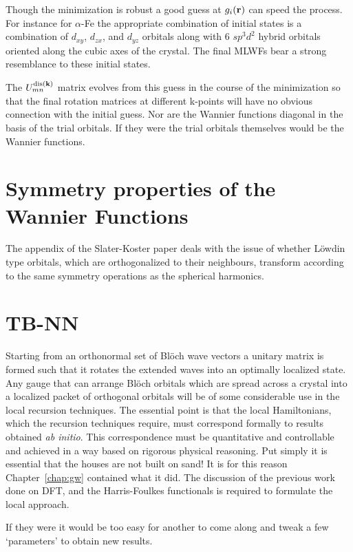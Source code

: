 Though the minimization is robust a good guess at $g_{i}({\bf r})$ can speed the process.
For instance for $\alpha$-Fe the appropriate combination of initial states is a combination of 
$d_{xy}$, $d_{zx}$, and $d_{yz}$ orbitals along with 6 $sp^{3}d^{2}$ hybrid orbitals oriented along the 
cubic axes of the crystal. The final MLWFs bear a strong resemblance to these initial states.

The $U^{{\rm dis}({\bf k})}_{mn}$ matrix evolves from this guess in the course of the 
minimization so that the final rotation matrices at different k-points will have no 
obvious connection with the initial guess. Nor are the Wannier functions diagonal in the basis 
of the trial orbitals. If they were the trial orbitals themselves would be the Wannier functions. 

\section{Symmetry properties of the Wannier Functions}
The appendix of the Slater-Koster paper deals with the issue of whether L\"owdin type
orbitals, which are orthogonalized to their neighbours, transform according to the same
symmetry operations as the spherical harmonics.

\section{TB-NN}
Starting from an orthonormal set
of Bl\"och wave vectors a unitary matrix is formed such that it rotates the
extended waves into an optimally localized state.
Any gauge that can arrange Bl\"och orbitals which are spread 
across a crystal into a localized
packet of orthogonal orbitals will be of some considerable use in the local recursion techniques.
The essential point is that the local Hamiltonians, which the recursion techniques require,
must correspond formally to results obtained {\it ab initio}. 
This correspondence must be quantitative and controllable and achieved in 
a way based on rigorous physical reasoning. 
Put simply it is essential that the houses are not built on sand! 
It is for this reason Chapter~\ref{chap:gw} contained what it did. The discussion of 
the previous work done on DFT, and the Harris-Foulkes functionals is required to formulate
the local approach.

If they were it would be too easy for another to come along and 
tweak a few `parameters' to obtain new results. 

